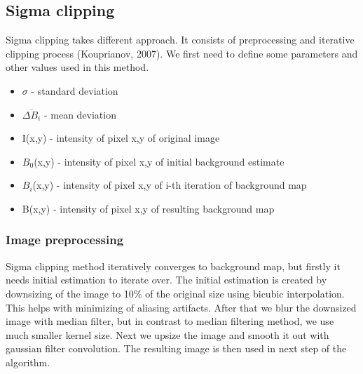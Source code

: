 \documentclass[12pt, a4paper, oneside]{book}
\begin{document}
\subsection{Sigma clipping}

Sigma clipping takes different approach.
It consists of preprocessing and iterative clipping process (Kouprianov, 2007).
We first need to define some parameters and other values used in this method.
\begin{itemize}
    \item{$\sigma$ - standard deviation}
    \item{$\overline{\Delta B_i}$ - mean deviation}
    \item{I(x,y) - intensity of pixel x,y of original image}
    \item{$B_0$(x,y) - intensity of pixel x,y of initial background estimate}
    \item{$B_i$(x,y) - intensity of pixel x,y of i-th iteration of background map}
    \item{B(x,y) - intensity of pixel x,y of resulting background map}
\end{itemize}

\subsubsection{Image preprocessing}
Sigma clipping method iteratively converges to background map, but firstly it needs initial estimation to iterate over.
The initial estimation is created by downsizing of the image to 10\% of the original size using bicubic interpolation.
This helps with minimizing of aliasing artifacts.
After that we blur the downsized image with median filter, but in contrast to median filtering method, we use much smaller kernel size.
Next we upsize the image and smooth it out with gaussian filter convolution.
The resulting image is then used in next step of the algorithm.
\end{document}
